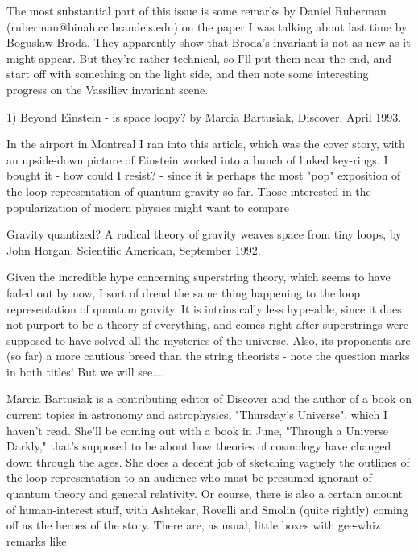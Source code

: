

The most substantial part of this issue is some remarks by
Daniel Ruberman (ruberman@binah.cc.brandeis.edu) on the paper I was
talking about last time by Boguslaw Broda.  They apparently show that
Broda's invariant is not as new as it might appear.  But they're rather
technical, so I'll put them near the end, and start off with something
on the light side, and then note some interesting progress on the
Vassiliev invariant scene.

1)  Beyond Einstein - is space loopy? by Marcia Bartusiak, Discover,
April 1993.

In the airport in Montreal I ran into this article, which was the cover
story, with an upside-down picture of Einstein worked into a bunch of
linked key-rings.  I bought it - how could I resist? - since it is 
perhaps the most "pop" exposition of the loop representation of quantum
gravity so far.  Those interested in the popularization of modern
physics might want to compare 

Gravity quantized? A radical theory of gravity weaves space from tiny
loops, by John Horgan, Scientific American, September 1992.

Given the incredible hype concerning superstring theory, which seems to
have faded out by now, I sort of dread the same thing happening to the
loop representation of quantum gravity.  It is intrinsically less
hype-able, since it does not purport to be a theory of everything, and
comes right after superstrings were supposed to have solved all the
mysteries of the universe.  Also, its proponents are (so far) a more
cautious breed than the string theorists - note the question marks in
both titles!   But we will see....

Marcia Bartusiak is a contributing editor of Discover and the author of
a book on current topics in astronomy and astrophysics, "Thursday's
Universe", which I haven't read.  She'll be coming out with a book in
June, "Through a Universe Darkly," that's supposed to be about how
theories of cosmology have changed down through the ages.  She does a
decent job of sketching vaguely the outlines of the loop representation
to an audience who must be presumed ignorant of quantum theory and
general relativity.  Or course, there is also a certain amount of
human-interest stuff, with Ashtekar, Rovelli and Smolin (quite rightly)
coming off as the heroes of the story.  There are, as usual, little
boxes with gee-whiz remarks like 

